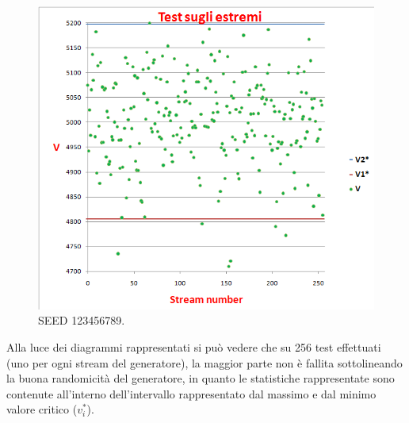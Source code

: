 \begin{itemize}
\begin{figure}[H]
  \centering
  \includegraphics[scale=0.5]{img/result_123456789.png}
  \caption[Test degli estremi]{SEED 123456789.}
  \label{fig:result_123456789}
\end{figure}
\end{itemize}

\vspace{0.5cm}
Alla luce dei diagrammi rappresentati si può vedere che su 256 test effettuati (uno per ogni stream del generatore), la maggior parte non è fallita sottolineando la buona randomicità del generatore, in quanto le statistiche rappresentate sono contenute all'interno dell'intervallo rappresentato dal massimo e dal minimo valore critico ($v_{i}^{*}$).

